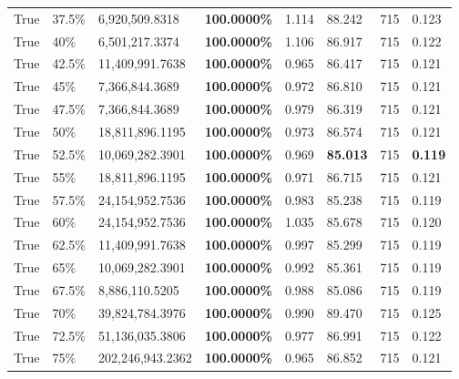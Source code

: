 \begin{table}[H]
\begin{tabular}{lllrllll}
\cline{1-8} \cline{2-8}
True & 37.5\% & 6,920,509.8318 & \bfseries \color{red} 100.0000\% & 1.114 & 88.242 & 715 & 0.123 \\
\cline{1-8} \cline{2-8}
True & 40\% & 6,501,217.3374 & \bfseries \color{red} 100.0000\% & 1.106 & 86.917 & 715 & 0.122 \\
\cline{1-8} \cline{2-8}
True & 42.5\% & 11,409,991.7638 & \bfseries \color{red} 100.0000\% & 0.965 & 86.417 & 715 & 0.121 \\
\cline{1-8} \cline{2-8}
True & 45\% & 7,366,844.3689 & \bfseries \color{red} 100.0000\% & 0.972 & 86.810 & 715 & 0.121 \\
\cline{1-8} \cline{2-8}
True & 47.5\% & 7,366,844.3689 & \bfseries \color{red} 100.0000\% & 0.979 & 86.319 & 715 & 0.121 \\
\cline{1-8} \cline{2-8}
True & 50\% & 18,811,896.1195 & \bfseries \color{red} 100.0000\% & 0.973 & 86.574 & 715 & 0.121 \\
\cline{1-8} \cline{2-8}
True & 52.5\% & 10,069,282.3901 & \bfseries \color{red} 100.0000\% & 0.969 & \bfseries \color{red} 85.013 & 715 & \bfseries \color{red} 0.119 \\
\cline{1-8} \cline{2-8}
True & 55\% & 18,811,896.1195 & \bfseries \color{red} 100.0000\% & 0.971 & 86.715 & 715 & 0.121 \\
\cline{1-8} \cline{2-8}
True & 57.5\% & 24,154,952.7536 & \bfseries \color{red} 100.0000\% & 0.983 & 85.238 & 715 & 0.119 \\
\cline{1-8} \cline{2-8}
True & 60\% & 24,154,952.7536 & \bfseries \color{red} 100.0000\% & 1.035 & 85.678 & 715 & 0.120 \\
\cline{1-8} \cline{2-8}
True & 62.5\% & 11,409,991.7638 & \bfseries \color{red} 100.0000\% & 0.997 & 85.299 & 715 & 0.119 \\
\cline{1-8} \cline{2-8}
True & 65\% & 10,069,282.3901 & \bfseries \color{red} 100.0000\% & 0.992 & 85.361 & 715 & 0.119 \\
\cline{1-8} \cline{2-8}
True & 67.5\% & 8,886,110.5205 & \bfseries \color{red} 100.0000\% & 0.988 & 85.086 & 715 & 0.119 \\
\cline{1-8} \cline{2-8}
True & 70\% & 39,824,784.3976 & \bfseries \color{red} 100.0000\% & 0.990 & 89.470 & 715 & 0.125 \\
\cline{1-8} \cline{2-8}
True & 72.5\% & 51,136,035.3806 & \bfseries \color{red} 100.0000\% & 0.977 & 86.991 & 715 & 0.122 \\
\cline{1-8} \cline{2-8}
True & 75\% & 202,246,943.2362 & \bfseries \color{red} 100.0000\% & 0.965 & 86.852 & 715 & 0.121 \\

\end{tabular}
\end{table}
